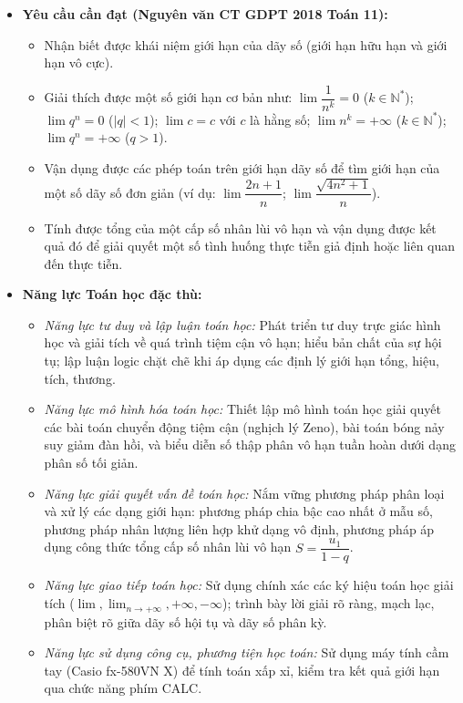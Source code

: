 \documentclass[12pt, a4paper]{article}
\begin{document}
\begin{itemize}[leftmargin=1.2cm]
    \item \textbf{Yêu cầu cần đạt (Nguyên văn CT GDPT 2018 Toán 11):}
    \begin{itemize}[leftmargin=0.6cm]
        \item Nhận biết được khái niệm giới hạn của dãy số (giới hạn hữu hạn và giới hạn vô cực).
        \item Giải thích được một số giới hạn cơ bản như: $\lim \dfrac{1}{n^k} = 0$ ($k \in \mathbb{N}^*$); $\lim q^n = 0$ ($|q| < 1$); $\lim c = c$ với $c$ là hằng số; $\lim n^k = +\infty$ ($k \in \mathbb{N}^*$); $\lim q^n = +\infty$ ($q > 1$).
        \item Vận dụng được các phép toán trên giới hạn dãy số để tìm giới hạn của một số dãy số đơn giản (ví dụ: $\lim \dfrac{2n+1}{n}$; $\lim \dfrac{\sqrt{4n^2+1}}{n}$).
        \item Tính được tổng của một cấp số nhân lùi vô hạn và vận dụng được kết quả đó để giải quyết một số tình huống thực tiễn giả định hoặc liên quan đến thực tiễn.
    \end{itemize}

    \item \textbf{Năng lực Toán học đặc thù:}
    \begin{itemize}[leftmargin=0.6cm]
        \item \textit{Năng lực tư duy và lập luận toán học:} Phát triển tư duy trực giác hình học và giải tích về quá trình tiệm cận vô hạn; hiểu bản chất của sự hội tụ; lập luận logic chặt chẽ khi áp dụng các định lý giới hạn tổng, hiệu, tích, thương.
        \item \textit{Năng lực mô hình hóa toán học:} Thiết lập mô hình toán học giải quyết các bài toán chuyển động tiệm cận (nghịch lý Zeno), bài toán bóng nảy suy giảm đàn hồi, và biểu diễn số thập phân vô hạn tuần hoàn dưới dạng phân số tối giản.
        \item \textit{Năng lực giải quyết vấn đề toán học:} Nắm vững phương pháp phân loại và xử lý các dạng giới hạn: phương pháp chia bậc cao nhất ở mẫu số, phương pháp nhân lượng liên hợp khử dạng vô định, phương pháp áp dụng công thức tổng cấp số nhân lùi vô hạn $S = \dfrac{u_1}{1 - q}$.
        \item \textit{Năng lực giao tiếp toán học:} Sử dụng chính xác các ký hiệu toán học giải tích ($\lim, \lim_{n \to +\infty}, +\infty, -\infty$); trình bày lời giải rõ ràng, mạch lạc, phân biệt rõ giữa dãy số hội tụ và dãy số phân kỳ.
        \item \textit{Năng lực sử dụng công cụ, phương tiện học toán:} Sử dụng máy tính cầm tay (Casio fx-580VN X) để tính toán xấp xỉ, kiểm tra kết quả giới hạn qua chức năng phím CALC.
    \end{itemize}


\end{itemize}
\end{document}
